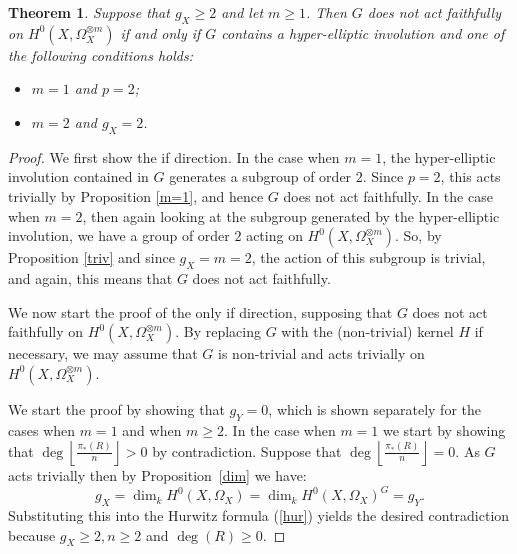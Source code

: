 \documentclass[11pt]{article} %
\newtheorem*{unnumthm}{Theorem}
\theoremstyle{remark}\newtheorem*{rem}{Remark}
\begin{document}
  \begin{unnumthm}
    Suppose that $g_X\geq 2$ and let $m\geq1$. 
    Then $G$ does not act faithfully on $H^0(X,\Omega_X^{\otimes m})$ if and only if $G$ contains a hyper-elliptic involution and one of the following conditions holds:
      \begin{itemize}
	\item $m=1$ and $p=2$;
	\item $m=2$ and $g_X=2$.
      \end{itemize}
  \end{unnumthm}
  \begin{proof}
    We first show the if direction. 
    In the case when $m=1$, the hyper-elliptic involution contained in $G$ generates a subgroup of order $2$.
    Since $p=2$, this acts trivially by Proposition \ref{m=1}, and hence $G$ does not act faithfully.
    In the case when $m=2$, then again looking at the subgroup generated by the hyper-elliptic involution, we have a group of order $2$ acting on $H^0(X,\Omega_X^{\otimes m})$.
    So, by Proposition \ref{triv} and since $g_X=m=2$, the action of this subgroup is trivial, and again, this means that $G$ does not act faithfully.


    We now start the proof of the only if direction, supposing that $G$ does not act faithfully on $H^0(X,\Omega_X^{\otimes m})$. 
    By replacing $G$ with the (non-trivial) kernel $H$ if necessary, we may assume that $G$ is non-trivial and acts trivially on $H^0(X,\Omega_X^{\otimes m})$.


    We start the proof by showing that $g_Y=0$, which is shown separately for the cases when $m=1$ and when $m\geq 2$.
    In the case when $m=1$ we start by showing that $\deg  \left\lfloor \frac {\pi_*(R)}{n} \right\rfloor >0$ by contradiction.
    Suppose that $\deg\left\lfloor \frac{\pi_*(R)}{n} \right\rfloor =0$.
    As $G$ acts trivially then by Proposition~\ref{dim} we have:
      \begin{equation*}
	g_X=\dim_k H^0(X,\Omega_X)=\dim_k H^0(X,\Omega_X)^G=g_Y.
      \end{equation*}
    Substituting this into the Hurwitz formula (\ref{hur}) yields the desired contradiction because $g_X\geq 2, n\geq 2$ and $\deg(R)\geq 0$.


\end{proof}
\end{document}
